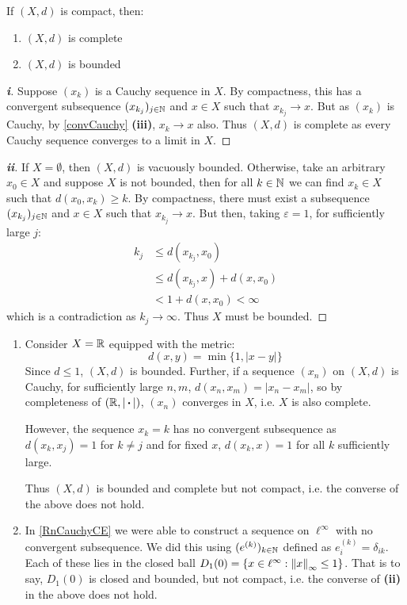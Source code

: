 \documentclass[../main.tex]{subfiles}
\begin{document}
\begin{theorem}
  If $(X, d)$ is compact, then: \label{compactBdd}
  \begin{enumerate}
    \item $(X, d)$ is complete
    \item $(X, d)$ is bounded
  \end{enumerate}
\end{theorem}
\begin{proof}[\textbf{i}]
  Suppose $(x_k)$ is a Cauchy sequence in $X$.
  By compactness, this has a convergent subsequence $(x_{k_j})_{j \in \mathbb{N}}$ and $x \in X$ such that $x_{k_{j}} \to x$.
  But as $(x_k)$ is Cauchy, by \cref{convCauchy} \textbf{(iii)}, $x_k \to x$ also.
  Thus $(X, d)$ is complete as every Cauchy sequence converges to a limit in $X$.
\end{proof}
\begin{proof}[\textbf{ii}]
  If $X = \emptyset$, then $(X, d)$ is vacuously bounded.
  Otherwise, take an arbitrary $x_0 \in X$ and suppose $X$ is not bounded, then for all $k \in \mathbb{N}$ we can find $x_k \in X$ such that $d(x_0, x_k) \geq k$.
  By compactness, there must exist a subsequence $(x_{k_j})_{j \in \mathbb{N}}$ and $x \in X$ such that $x_{k_{j}} \to x$.
  But then, taking $\varepsilon = 1$, for sufficiently large $j$:
  \begin{align*}
    k_j &\leq d(x_{k_j}, x_0) \\
        &\leq d(x_{k_{j}}, x) + d(x, x_0) \\
        &< 1 + d(x, x_0) < \infty
  \end{align*}
  which is a contradiction as $k_j \to \infty$.
  Thus $X$ must be bounded.
\end{proof}
\begin{example}
  \begin{enumerate}
    \item Consider $X = \mathbb{R}$ equipped with the metric:
      \[
        d(x, y) = \min\{1, |x - y|\}
      \]
      Since $d \leq 1$, $(X, d)$ is bounded.
      Further, if a sequence $(x_n)$ on $(X, d)$ is Cauchy, for sufficiently large $n, m$, $d(x_n, x_m) = |x_n - x_m|$, so by completeness of $(\mathbb{R}, |{\hspace{0.18em}\boldsymbol{\cdot}\hspace{0.18em}}|)$, $(x_n)$ converges in $X$, i.e. $X$ is also complete.

      However, the sequence $x_k = k$ has no convergent subsequence as $d(x_{k}, x_{j}) = 1$ for $k \neq j$ and for fixed $x$, $d(x_k, x) = 1$ for all $k$ sufficiently large.

      Thus $(X, d)$ is bounded and complete but not compact, i.e. the converse of the above does not hold.
    \item In \cref{RnCauchyCE} we were able to construct a sequence on $\ell^{\infty}$ with no convergent subsequence.
      We did this using $(e^{(k)})_{k \in \mathbb{N}}$ defined as $e^{(k)}_i = \delta_{i k}$.
      Each of these lies in the closed ball $D_1(0) = \{x \in \ell^{\infty}: \left\lVert x \right\rVert_{\infty} \leq 1\}$.
      That is to say, $D_1(0)$ is closed and bounded, but not compact, i.e. the converse of \textbf{(ii)} in the above does not hold.
  \end{enumerate}
\end{example}
\end{document}

